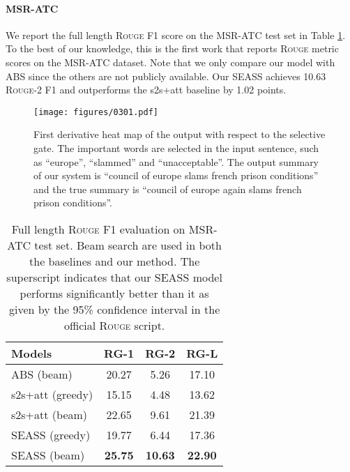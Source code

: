 \documentclass[11pt,a4paper]{article}
\newcommand{\ourModelName}{SEASS}
\begin{document}
\paragraph{MSR-ATC}

We report the full length \textsc{Rouge} F1 score on the MSR-ATC test set in Table \ref{msr-table}.
To the best of our knowledge, this is the first work that reports \textsc{Rouge} metric scores on the MSR-ATC dataset.
Note that we only compare our model with ABS since the others are not publicly available.
Our \ourModelName{} achieves 10.63 \textsc{Rouge}-2 F1 and outperforms the s2s+att baseline by 1.02 points.

\begin{figure*}[h]
	\centering
	\texttt{[image: figures/0301.pdf]}
	\caption{\label{fig:sal} First derivative heat map of the output with respect to the selective gate.
		The important words are selected in the input sentence, such as ``europe'', ``slammed'' and ``unacceptable''. The output summary of our system is ``council of europe slams french prison conditions'' and the true summary is ``council of europe again slams french prison conditions''.}
\end{figure*}

\begin{table}[htb]
	\begin{center}
		\begin{tabular}{lccc}
			\toprule
			\bf Models & \bf RG-1 & \bf RG-2 & \bf RG-L \\ 
			\midrule
			ABS (beam)  & 20.27\significant{} & 5.26\significant{} & 17.10\significant{} \\
			s2s+att (greedy)  & 15.15\significant{} & 4.48\significant{} & 13.62\significant{} \\
			s2s+att (beam)  & 22.65\significant{} & 9.61\significant{} & 21.39\significant{} \\
			\hline
			\ourModelName{} (greedy)  & 19.77 &  6.44 & 17.36 \\
			\ourModelName{} (beam)  & \textbf{25.75} &  \textbf{10.63} & \textbf{22.90} \\
			\bottomrule
		\end{tabular}
	\end{center}
	\caption{\label{msr-table} Full length \textsc{Rouge} F1 evaluation on MSR-ATC test set. Beam search are used in both the baselines and our method. The superscript \significant{}  indicates that our \ourModelName{} model performs significantly better than it as given by the 95\% confidence interval in the official \textsc{Rouge} script.}
\end{table}
 
\end{document}
